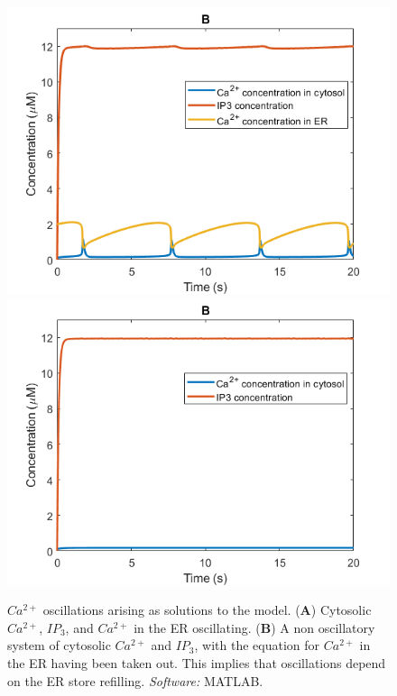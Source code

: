 \begin{figure}[!htb]
\centering
{}
  \includegraphics[width=\linewidth]{Chapters/2_Ca2+_Models/extras/oscillations.png}
\endminipage\hfill\\
  \includegraphics[width=\linewidth]{Chapters/2_Ca2+_Models/extras/no_oscillations.png}
\endminipage\hfill
\caption{{$Ca^{2+}$ oscillations arising as solutions to the  model. (\textbf{A}) Cytosolic $Ca^{2+}$, $IP_3$, and $Ca^{2+}$ in the ER oscillating. (\textbf{B}) A non oscillatory system of cytosolic $Ca^{2+}$ and $IP_3$, with the equation for $Ca^{2+}$ in the ER having been taken out. This implies that oscillations depend on the ER store refilling.} \textit{Software:} MATLAB.}\label{sandersfig}
\end{figure}

